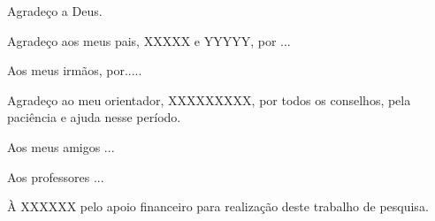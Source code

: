 \begin{agradecimentos}

Agradeço a Deus.

Agradeço aos meus pais, XXXXX e YYYYY, por ...

Aos meus irmãos, por.....

Agradeço ao meu orientador, XXXXXXXXX, por todos os conselhos, pela paciência e ajuda nesse período.

Aos meus amigos ...

Aos professores ...

À XXXXXX pelo apoio financeiro para realização deste trabalho de pesquisa.

\end{agradecimentos}
